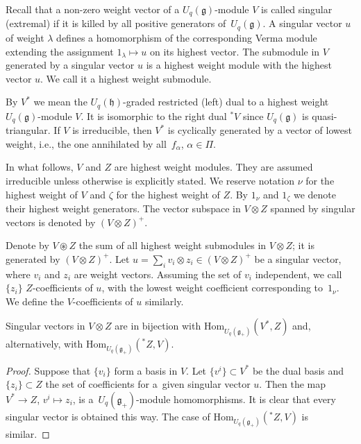 Recall that a non-zero weight vector of a $U_q(\mathfrak{g})$-module $V$ is called singular (extremal) if it is killed by all positive generators of~$U_q(\mathfrak{g})$. A singular vector $u$ of weight $\lambda$ defines a homomorphism of the corresponding Verma module extending the assignment $1_\lambda\mapsto u$ on its highest vector. The submodule in $V$ generated by a singular vector $u$ is a highest weight module with the highest vector $u$. We call it a highest weight submodule.

By $V^*$ we mean the $U_q(\mathfrak{h})$-graded restricted (left) dual to a highest weight $U_q(\mathfrak{g})$-module $V$. It is isomorphic to the right dual ${}^*\!V$ since $U_q(\mathfrak{g})$ is quasi-triangular. If $V$ is irreducible, then $V^*$ is cyclically generated by a vector of lowest weight, i.e., the one annihilated by all~$f_\alpha$, $\alpha \in \Pi$.

In what follows, $V$ and $Z$ are highest weight modules. They are assumed irreducible unless otherwise is explicitly stated. We reserve notation $\nu$ for the highest weight of $V$ and $\zeta$ for the highest weight of $Z$.
By $1_\nu$ and $1_\zeta$ we denote their highest weight generators. The vector subspace in $V\otimes Z$ spanned by singular vectors is denoted by $(V\otimes Z)^+$.

Denote by $V\circledast Z$ the sum of all highest weight submodules in $V\otimes Z$; it is generated by $(V\otimes Z)^+$. Let $u=\sum_{i}v_i\otimes z_i\in (V\otimes Z)^+$ be a singular vector, where $v_i$ and $z_i$ are weight vectors. Assuming the set of $v_i$ independent, we call $\{z_i\}$ $Z$-coefficients of $u$, with the lowest weight coefficient corresponding to~$1_\nu$. We define the $V$-coefficients of $u$ similarly.

\begin{Lemma}\label{duality}Singular vectors in $V\otimes Z$ are in bijection with $\mathrm{Hom}_{U_q(\mathfrak{g}_+)}(V^*,Z)$ and, alternatively, with $\mathrm{Hom}_{U_q(\mathfrak{g}_+)}({}^*\!Z,V)$.
\end{Lemma}
\begin{proof}Suppose that $\{v_i\}$ form a basis in $V$. Let $\{v^i\}\subset V^*$ be the dual basis and $\{z_i\}\subset Z$ the set of coefficients for a~given singular vector $u$. Then the map $V^*\to Z$, $v^i\mapsto z_i$, is a~$U_q(\mathfrak{g}_+)$-module homomorphisms. It is clear that every singular vector is obtained this way. The case of $\mathrm{Hom}_{U_q(\mathfrak{g}_+)}({}^*\!Z,V)$ is similar.
\end{proof}

